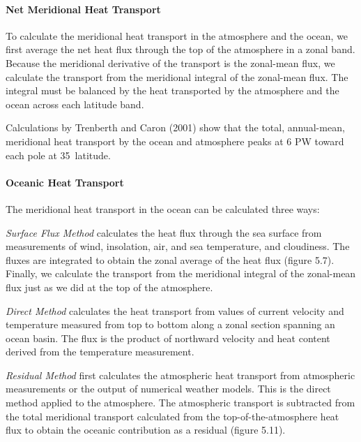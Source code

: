\paragraph{Net Meridional Heat Transport}
To calculate the meridional heat transport
in the atmosphere and the ocean, we first average the net heat
flux through the
top of the atmosphere in a zonal band. Because the meridional
derivative of the transport is the zonal-mean flux, we calculate the
transport from the meridional integral of the zonal-mean flux. The
integral must be balanced by the heat transported by the atmosphere
and the ocean across each latitude band.

Calculations by Trenberth and Caron (2001) show that the total,
annual-mean, meridional heat transport by
the ocean and atmosphere peaks at 6 PW toward each pole at
35\degrees\ latitude.

\paragraph{Oceanic Heat Transport}
The meridional heat
transport in the ocean can be calculated
three ways:
\begin{enumerate}

\vitem
\textit{Surface Flux Method} calculates the heat flux through the sea surface from measurements of wind,
insolation, air, and sea temperature, and
cloudiness. The fluxes are integrated to obtain the zonal average of
the heat flux (figure 5.7). Finally, we
calculate the transport from the meridional integral of the zonal-mean
flux just as we did at the top of the atmosphere.

\vitem
\textit{Direct Method}  calculates the heat transport from values of current
velocity and temperature measured from top to bottom along a zonal
section spanning an ocean basin. The flux is the product of northward
velocity and heat content derived from the temperature measurement.

\vitem
\textit{Residual Method}  first calculates the
atmospheric heat transport from atmospheric measurements or the output
of numerical weather models. This is the direct method applied to the
atmosphere. The atmospheric transport is subtracted from the total
meridional transport calculated from the top-of-the-atmosphere heat
flux to obtain the
oceanic contribution as a residual (figure 5.11).
\end{enumerate}


